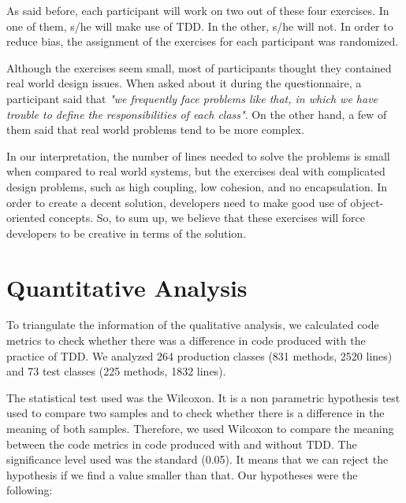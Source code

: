 \documentclass[times]{elsarticle}
\begin{document}
As said before, each participant will work on two out of these four exercises.
In one of them, s/he will make use of TDD. In the other, s/he will not. In order to
reduce bias, the assignment of the exercises for each participant was randomized.

Although the exercises seem small, most of participants thought they contained 
real world design issues. When asked about it during the questionnaire, a participant
said that \textit{"we frequently face problems like that, in which we have trouble to
define the responsibilities of each class"}. On the other hand, a few of them said
that real world problems tend to be more complex. 

In our interpretation, the
number of lines needed to solve the problems is small when compared to real world systems,
but the exercises deal with complicated design problems, such as high coupling, low cohesion, and no
encapsulation. In order to create a decent solution, developers need to make good
use of object-oriented concepts. So, to sum up, we believe that these exercises will force
developers to be creative in terms of the solution.

\section{Quantitative Analysis}
\label{sec:quantitative}

To triangulate the information of the qualitative analysis, we calculated
code metrics to check whether there was a difference in code produced
with the practice of TDD.
We analyzed
264 production classes (831 methods, 2520 lines) and
73 test classes (225 methods, 1832 lines).

The statistical test used was the Wilcoxon. It is a non parametric hypothesis test
used to compare two samples and to check whether there is a difference in the meaning
of both samples. Therefore, we used Wilcoxon to compare the meaning between
the code metrics in code produced with and without TDD. The significance level
used was the standard (0.05). It means that we can reject the hypothesis if we
find a value smaller than that. Our hypotheses were the following:
\end{document}
